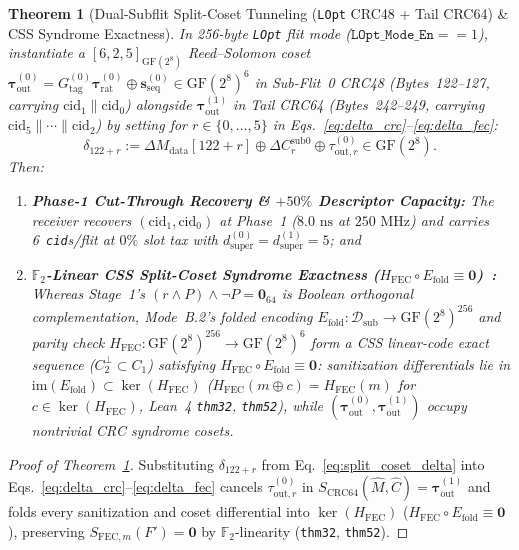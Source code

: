 \documentclass[11pt,letterpaper]{article}
\theoremstyle{spectralthm}
\newtheorem{theorem}{Theorem}[section]
\begin{document}
\begin{theorem}[Dual-Subflit Split-Coset Tunneling (\texttt{LOpt} CRC48 + Tail CRC64) \& CSS Syndrome Exactness]
\label{thm:split_coset}
In 256-byte \texttt{LOpt} flit mode ($\texttt{LOpt\_Mode\_En} == 1$), instantiate a $[6,2,5]_{\mathrm{GF}(2^8)}$ Reed--Solomon coset $\boldsymbol{\tau}_{\mathrm{out}}^{(0)} = G_{\mathrm{tag}}^{(0)}\boldsymbol{\tau}_{\mathrm{rat}}^{(0)} \oplus \mathbf{s}_{\mathrm{seq}}^{(0)} \in \mathrm{GF}(2^8)^6$ in Sub-Flit~0 CRC48 (Bytes~122--127, carrying $\mathrm{cid}_1 \parallel \mathrm{cid}_0$) alongside $\boldsymbol{\tau}_{\mathrm{out}}^{(1)}$ in Tail CRC64 (Bytes~242--249, carrying $\mathrm{cid}_5 \parallel \cdots \parallel \mathrm{cid}_2$) by setting for $r \in \{0,\ldots,5\}$ in Eqs.~\eqref{eq:delta_crc}--\eqref{eq:delta_fec}:
\begin{equation}
\label{eq:split_coset_delta}
\delta_{122+r} := \Delta M_{\mathrm{data}}[122+r] \oplus \Delta C_r^{\mathrm{sub0}} \oplus \tau_{\mathrm{out},r}^{(0)} \in \mathrm{GF}(2^8).
\end{equation}
Then:
\begin{enumerate}
  \item[(i)] \textbf{Phase-1 Cut-Through Recovery \& $+50\%$ Descriptor Capacity:} The receiver recovers $(\mathrm{cid}_1, \mathrm{cid}_0)$ at Phase~1 ($8.0\text{~ns}$ at $250\text{~MHz}$) and carries 6~\texttt{cid}s/flit at $0\%$ slot tax with $d_{\mathrm{super}}^{(0)} = d_{\mathrm{super}}^{(1)} = 5$; and
  \item[(ii)] \textbf{$\mathbb{F}_2$-Linear CSS Split-Coset Syndrome Exactness ($H_{\mathrm{FEC}} \circ E_{\mathrm{fold}} \equiv \mathbf{0}$)~\cite{calderbank1996good}:} Whereas Stage~1's $(r \wedge P) \wedge \neg P = \mathbf{0}_{64}$ is Boolean orthogonal complementation, Mode~B.2's folded encoding $E_{\mathrm{fold}} : \mathcal{D}_{\mathrm{sub}} \to \mathrm{GF}(2^8)^{256}$ and parity check $H_{\mathrm{FEC}} : \mathrm{GF}(2^8)^{256} \to \mathrm{GF}(2^8)^6$ form a CSS linear-code exact sequence ($C_2^\perp \subset C_1$) satisfying $H_{\mathrm{FEC}} \circ E_{\mathrm{fold}} \equiv \mathbf{0}$: sanitization differentials lie in $\mathrm{im}(E_{\mathrm{fold}}) \subset \ker(H_{\mathrm{FEC}})$ ($H_{\mathrm{FEC}}(m \oplus c) = H_{\mathrm{FEC}}(m)$ for $c \in \ker(H_{\mathrm{FEC}})$, Lean~4 \texttt{thm32}, \texttt{thm52}), while $(\boldsymbol{\tau}_{\mathrm{out}}^{(0)}, \boldsymbol{\tau}_{\mathrm{out}}^{(1)})$ occupy nontrivial CRC syndrome cosets.
\end{enumerate}
\end{theorem}
\begin{proof}[Proof of Theorem~\ref{thm:split_coset}]
Substituting $\delta_{122+r}$ from Eq.~\eqref{eq:split_coset_delta} into Eqs.~\eqref{eq:delta_crc}--\eqref{eq:delta_fec} cancels $\tau_{\mathrm{out},r}^{(0)}$ in $S_{\mathrm{CRC64}}(\hat{M},\hat{C}) = \boldsymbol{\tau}_{\mathrm{out}}^{(1)}$ and folds every sanitization and coset differential into $\ker(H_{\mathrm{FEC}})$ ($H_{\mathrm{FEC}} \circ E_{\mathrm{fold}} \equiv \mathbf{0}$), preserving $S_{\mathrm{FEC},m}(F') = \mathbf{0}$ by $\mathbb{F}_2$-linearity (\texttt{thm32}, \texttt{thm52}).
\end{proof}
\end{document}
